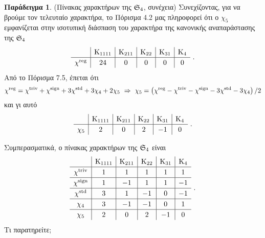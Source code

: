 \documentclass[12pt,a4paper,reqno]{amsart}
\theoremstyle{definition}
\newtheorem*{example}{Παράδειγμα}
\begin{document}
\begin{example}{\rm(Πίνακας χαρακτήρων της $\mathfrak{S}_4$, συνέχεια)}
    Συνεχίζοντας, για να βρούμε τον τελευταίο χαρακτήρα, το Πόρισμα 4.2 μας πληροφορεί ότι ο $\chi_5$ εμφανίζεται στην ισοτυπική διάσπαση του χαρακτήρα της κανονικής αναπαράστασης της $\mathfrak{S}_4$
    \[
    \renewcommand{\arraystretch}{1.2} 
    \begin{array}{c|c|c|c|c|c}
              & \rmK_{1111}  & \rmK_{211}  & \rmK_{22} & \rmK_{31} & \rmK_4  \\ \hline
    \chi^\reg & 24           & 0           & 0         & 0         & 0 
    \end{array}\ .
    \]
    Από το Πόρισμα 7.5, έπεται ότι 
    \[
    \chi^\reg = \chi^\triv + \chi^\sign + 3\chi^\std + 3\chi_4 + 2\chi_5 \ \then \ 
    \chi_5 = \left(\chi^\reg - \chi^\triv - \chi^\sign - 3\chi^\std - 3\chi_4\right)/2
    \]
    και γι αυτό 
    \[
    \renewcommand{\arraystretch}{1.2} 
    \begin{array}{c|c|c|c|c|c}
           & \rmK_{1111}  & \rmK_{211}  & \rmK_{22} & \rmK_{31} & \rmK_4  \\ \hline
    \chi_5 & 2            & 0           & 2         & -1        & 0 
    \end{array}\ .
    \]

    Συμπερασματικά, ο πίνακας χαρακτήρων της $\mathfrak{S}_4$ είναι 
    \[
    \renewcommand{\arraystretch}{1.2} 
    \begin{array}{c|c|c|c|c|c}
               & \rmK_{1111}  & \rmK_{211}  & \rmK_{22} & \rmK_{31} & \rmK_4  \\ \hline
    \chi^\triv & 1            & 1           & 1         & 1         & 1 \\ \hline 
    \chi^\sign & 1            & -1          & 1         & 1         & -1 \\ \hline 
    \chi^\std  & 3            & 1           & -1        & 0         & -1  \\ \hline 
    \chi_4     & 3            & -1          & -1        & 0         & 1 \\ \hline 
    \chi_5     & 2            & 0           & 2         & -1        & 0
    \end{array}\ .
    \]
    Τι παρατηρείτε;
\end{example}
\end{document}
